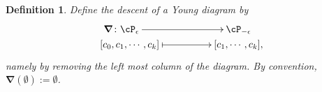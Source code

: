 \documentclass[12pt,a4paper]{amsart}
\makeatletter
\newcommand{\depth}{\mathrm{depth}}
\def\inn#1#2{\left\langle
      \def\ta{#1}\def\tb{#2}
      \ifx\ta\@empty{\;} \else {\ta}\fi ,
      \ifx\tb\@empty{\;} \else {\tb}\fi
      \right\rangle}
\def\DD{\nabla}
\def\DDc{\boldsymbol{\nabla}}
\numberwithin{equation}{section}
\def\flushmr#1{\makebox[0pt][r]{${#1}$}}
\newtheorem{defn}[thm]{Definition}
\theoremstyle{remark}
\makeatother
\begin{document}



\begin{defn}\label{defdo}
Define the descent of a Young diagram by
\[
\xymatrix@R=0em@C=5em{
  \flushmr{\DDc\colon} \cP_{\epsilon} \ar[r] & \cP_{-\epsilon}\\
[c_0,c_1,\cdots ,c_k] \ar@{|->}[r]&  [c_1,\cdots, c_k],
}
\]
namely by removing the left most column of the diagram.
By convention,  $\DDc(\emptyset) := \emptyset$.
\end{defn}



\end{document}
